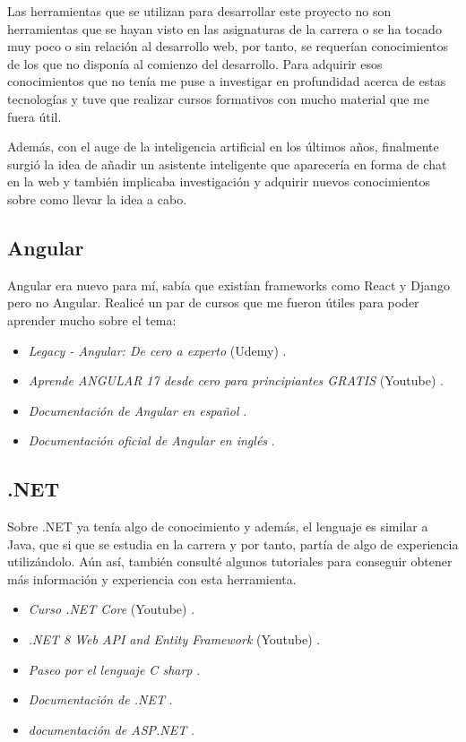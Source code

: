 Las herramientas que se utilizan para desarrollar este proyecto no son herramientas que se hayan visto en las asignaturas de la carrera o se ha tocado muy poco o sin relación al desarrollo web, por tanto, se requerían conocimientos de los que no disponía al comienzo del desarrollo. Para adquirir esos conocimientos que no tenía me puse a investigar en profundidad acerca de estas tecnologías y tuve que realizar cursos formativos con mucho material que me fuera útil.

Además, con el auge de la inteligencia artificial en los últimos años, finalmente surgió la idea de añadir un asistente inteligente que aparecería en forma de chat en la web y también implicaba investigación y adquirir nuevos conocimientos sobre como llevar la idea a cabo.

\subsection{Angular}

Angular era nuevo para mí, sabía que existían frameworks como React y Django pero no Angular. Realicé un par de cursos que me fueron útiles para poder aprender mucho sobre el tema:

\begin{itemize}
\tightlist
\item
  \emph{Legacy - Angular: De cero a experto} (Udemy)
  \cite{course:angular_legacy}.
\item
  \emph{Aprende ANGULAR 17 desde cero para principiantes GRATIS} (Youtube)
  \cite{course:angular_midudev}.
\item
  \emph{Documentación de Angular en español}
  \cite{web:angular_hispano}.
\item
  \emph{Documentación oficial de Angular en inglés}
  \cite{web:angular_oficial}.
\end{itemize}


\subsection{.NET}

Sobre .NET ya tenía algo de conocimiento y además, el lenguaje es similar a Java, que si que se estudia en la carrera y por tanto, partía de algo de experiencia utilizándolo. Aún así, también consulté algunos tutoriales para conseguir obtener más información y experiencia con esta herramienta.

\begin{itemize}
\tightlist
\item
  \emph{Curso .NET Core} (Youtube)
  \cite{web:curso-net}.
\item
  \emph{.NET 8 Web API and Entity Framework} (Youtube)
  \cite{web:net-web-api}.
\item
  \emph{Paseo por el lenguaje C sharp}
  \cite{web:net_tutorial}.
\item
  \emph{Documentación de .NET}
  \cite{web:net_documentacion}.
\item
  \emph{documentación de ASP.NET}
  \cite{web:net-asp}.
\end{itemize}


